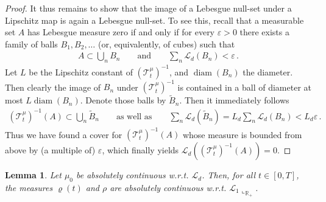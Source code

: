 \documentclass[A4paper,11pt]{article}
\newtheorem{lemma}[theorem]{Lemma}
\theoremstyle{definition}
\newcommand{\R}{\mathbb{R}}
\newcommand{\cl}{\mathcal{L}}
\newcommand{\ct}{\mathcal{T}}
\DeclareMathOperator{\diam}{diam}
\begin{document}
\begin{proof}
	It thus remains to show that the image of a Lebesgue null-set under a Lipschitz map is again a Lebesgue null-set. To see this,
	recall that a measurable set $A$ has Lebesgue measure zero if and only if for every $\varepsilon>0$ there exists a
	family of balls $B_1,B_2,\ldots$ (or, equivalently, of cubes) such that
	\begin{align*}
		A\subset\bigcup_n B_n\qquad\text{and}\qquad\sum_n\cl_d(B_n)<\varepsilon\,.
	\end{align*}
	Let $L$ be the Lipschitz constant of $(\ct^\mu_t)^{-1}$, and $\diam(B_n)$ the diameter. Then clearly the image of
	$B_n$ under $(\ct^\mu_t)^{-1}$ is contained in a ball of diameter at most $L\diam(B_n)$. Denote those balls by
	$\widetilde B_n$.
	Then it immediately follows
	\begin{align*}
		(\ct^\mu_t)^{-1}(A)\subset\bigcup_n\widetilde B_n\qquad\text{as well as}\qquad
		\sum_n\cl_d(\widetilde B_n)=L_d\sum_n\cl_d(B_n)<L_d\varepsilon\,.
	\end{align*}
	Thus we have found a cover for $(\ct^\mu_t)^{-1}(A)$ whose measure is bounded from above by (a multiple of) $\varepsilon$, which finally
	yields $\cl_d((\ct^\mu_t)^{-1}(A))=0$.
\end{proof}

\begin{lemma}\label{le-abs}
	Let $\mu_0$ be absolutely continuous w.r.t. $\cl_d$. Then, for all $t\in [0,T]$, the measures $\varrho(t)$ and $\rho$ are absolutely
	continuous w.r.t. $\cl_1\llcorner_{\R_+}$.
\end{lemma}
\end{document}
